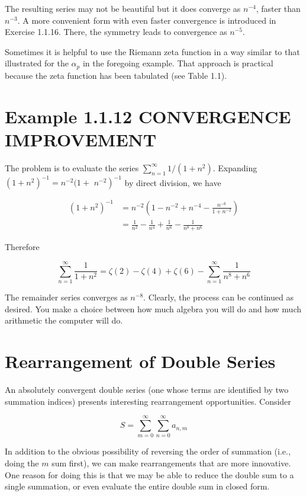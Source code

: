 \documentclass[10pt]{article}
\begin{document}
The resulting series may not be beautiful but it does converge as $n^{-4}$, faster than $n^{-3}$. A more convenient form with even faster convergence is introduced in Exercise 1.1.16. There, the symmetry leads to convergence as $n^{-5}$.

Sometimes it is helpful to use the Riemann zeta function in a way similar to that illustrated for the $\alpha_{p}$ in the foregoing example. That approach is practical because the zeta function has been tabulated (see Table 1.1).

\section*{Example 1.1.12 CONVERGENCE IMPROVEMENT}
The problem is to evaluate the series $\sum_{n=1}^{\infty} 1 /\left(1+n^{2}\right)$. Expanding $\left(1+n^{2}\right)^{-1}=n^{-2}(1+$ $\left.n^{-2}\right)^{-1}$ by direct division, we have

$$
\begin{aligned}
\left(1+n^{2}\right)^{-1} & =n^{-2}\left(1-n^{-2}+n^{-4}-\frac{n^{-6}}{1+n^{-2}}\right) \\
& =\frac{1}{n^{2}}-\frac{1}{n^{4}}+\frac{1}{n^{6}}-\frac{1}{n^{8}+n^{6}}
\end{aligned}
$$

Therefore

$$
\sum_{n=1}^{\infty} \frac{1}{1+n^{2}}=\zeta(2)-\zeta(4)+\zeta(6)-\sum_{n=1}^{\infty} \frac{1}{n^{8}+n^{6}}
$$

The remainder series converges as $n^{-8}$. Clearly, the process can be continued as desired. You make a choice between how much algebra you will do and how much arithmetic the computer will do.

\section*{Rearrangement of Double Series}
An absolutely convergent double series (one whose terms are identified by two summation indices) presents interesting rearrangement opportunities. Consider


\begin{equation*}
S=\sum_{m=0}^{\infty} \sum_{n=0}^{\infty} a_{n, m} \tag{1.29}
\end{equation*}


In addition to the obvious possibility of reversing the order of summation (i.e., doing the $m$ sum first), we can make rearrangements that are more innovative. One reason for doing this is that we may be able to reduce the double sum to a single summation, or even evaluate the entire double sum in closed form.
\end{document}
